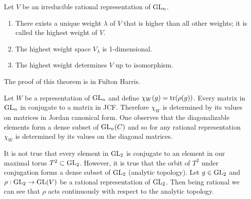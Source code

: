 \documentclass[12pt]{article}
\begin{document}
\begin{theorem}
Let $V$ be an irreducible rational representation of $\operatorname{GL}_n$. \begin{enumerate}
    \item There exists a unique weight $\lambda$ of $V$ that is higher than all other weights; it is called the highest weight of $V$.
    \item The highest weight space $V_\lambda$ is 1-dimensional.
    \item The highest weight determines $V$ up to isomorphism.
\end{enumerate}
\end{theorem}
The proof of this theorem is in Fulton Harris.


\hfill

Let $W$ be a representation of $\operatorname{GL}_n$ and define $\chi_W(g) = \operatorname{tr}(\rho(g))$. Every matrix in $\operatorname{GL}_n$ in conjugate to a matrix in JCF. Therefore $\chi_W$ is determined by its values on matrices in Jordan canonical form. One observes that the diagonalizable elements form a dense subset of $\operatorname{GL}_n(C)$ and so for any rational representation $\chi_W$ is determined by its values on the diagonal matrices.

\hfill


It is not true that every element in $\operatorname{GL}_2$ is conjugate to an element in our maximal torus $T^2\subset\operatorname{GL}_2$. However, it is true that the orbit of $T^2$ under conjugation forms a dense subset of $\operatorname{GL}_2$ (analytic topology). Let $g\in\operatorname{GL}_2$ and $\rho:\operatorname{GL}_2\to \operatorname{GL}(V)$ be a rational representation of $\operatorname{GL}_2$. Then being rational  we can see that $\rho$ acts continuously with respect to the analytic topology. 

\hfill
\end{document}

